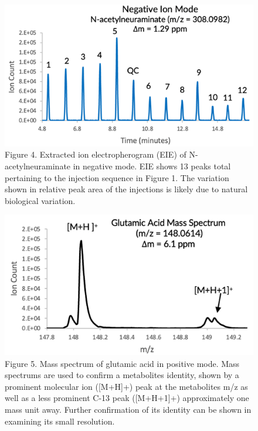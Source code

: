 \documentclass[journal=jacsat,manuscript=article]{achemso}
\begin{document}
\begin{figure}
\includegraphics[width=1\linewidth]{../Figures/Figure4} \caption{Figure 4. Extracted ion electropherogram (EIE) of N-acetylneuraminate in negative mode. EIE shows 13 peaks total pertaining to the injection sequence in Figure 1. The variation shown in relative peak area of the injections is likely due to natural biological variation.}\label{fig:unnamed-chunk-4}
\end{figure}

\begin{figure}
\includegraphics[width=1\linewidth]{../Figures/Figure5} \caption{Figure 5. Mass spectrum of glutamic acid in positive mode. Mass spectrums are used to confirm a metabolites identity, shown by a prominent molecular ion ([M+H]+) peak at the metabolites m/z as well as a less prominent C-13 peak ([M+H+1]+) approximately one mass unit away. Further confirmation of its identity can be shown in examining its small resolution.}\label{fig:unnamed-chunk-5}
\end{figure}
\end{document}
